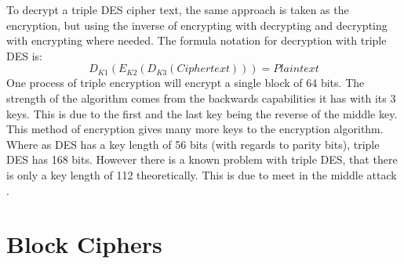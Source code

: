 \documentclass[11pt,a4paper, notitlepage]{report}
\begin{document}
To decrypt a triple DES cipher text, the same approach is taken as the encryption, but using the inverse of encrypting with decrypting and decrypting with encrypting where needed. The formula notation for decryption with triple DES is: 
\begin{displaymath}
D_{K1}(E_{K2}(D_{K3}(Cipher text))) = Plain text
\end{displaymath}
One process of triple encryption will encrypt a single block of 64 bits. The strength of the algorithm comes from the backwards capabilities it has with its 3 keys. This is due to the first and the last key being the reverse of the middle key. This method of encryption gives many more keys to the encryption algorithm. Where as DES has a key length of 56 bits (with regards to parity bits), triple DES has 168 bits. However there is a known problem with triple DES, that there is only a key length of 112 theoretically. This is due to meet in the middle attack \cite{FouqueK13Security}.













\section{Block Ciphers}
\label{sec:BCipher}
\end{document}
